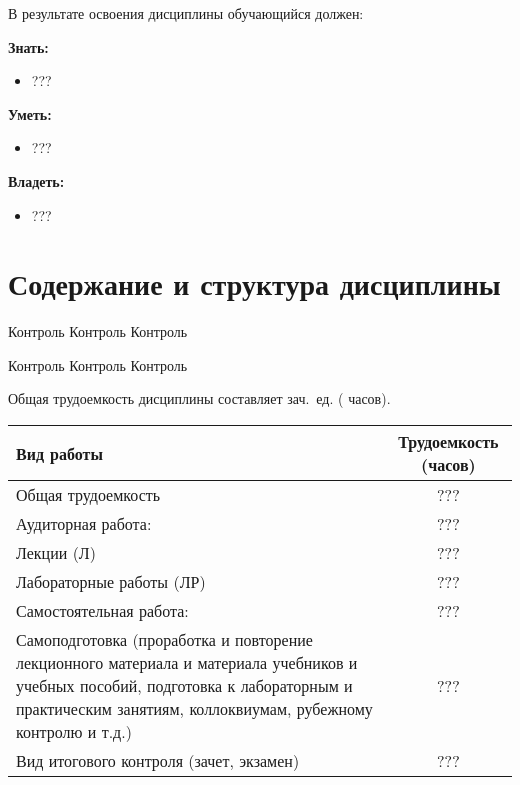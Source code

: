 В результате освоения дисциплины обучающийся должен:

\textbf{Знать:}
	\begin{itemize}
		\item ???
	\end{itemize}

\textbf{Уметь:}
	\begin{itemize}
		\item ???
	\end{itemize}

\textbf{Владеть:}
	\begin{itemize}
		\item ???
	\end{itemize}

\section{Содержание и структура дисциплины}
	

	{\lipsum[1-2]}
	{Контроль Контроль Контроль}

	{\lipsum[3-4]}
	{Контроль Контроль Контроль}


	 Общая трудоемкость дисциплины составляет
	 зач.~ед. ( часов).

\renewcommand{\arraystretch}{1.5}
\setlength\LTleft{0pt}
\setlength\LTright{0pt}
\begin{longtable}{|p{9cm} | c|} \hline
\textbf{Вид работы} & \textbf{Трудоемкость (часов)} \\ \hline
Общая трудоемкость 			& ??? \\ \hline
Аудиторная работа: 			& ??? \\ \hline
Лекции (Л) 					& ??? \\ \hline
Лабораторные работы (ЛР) 	& ??? \\ \hline
Самостоятельная работа: 	& ??? \\ \hline
Самоподготовка (проработка и повторение лекционного материала и материала учебников и учебных пособий, подготовка к лабораторным и практическим занятиям, коллоквиумам, рубежному контролю и т.д.)%
							& ??? \\ \hline
Вид итогового контроля (зачет, экзамен)%
							& ??? \\ \hline
\end{longtable}

